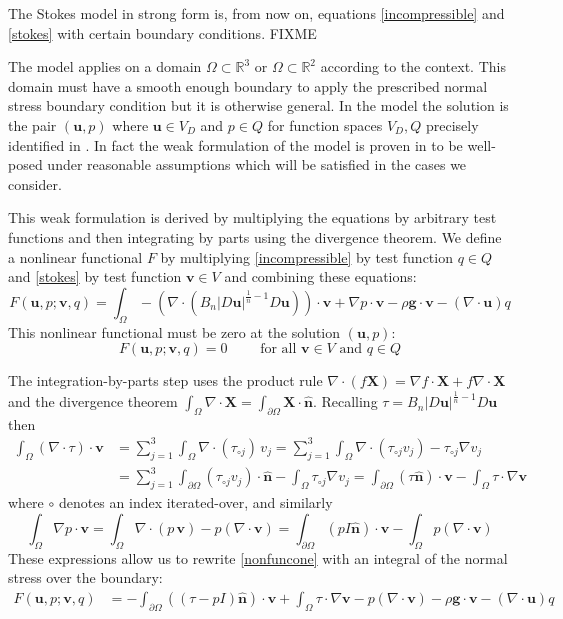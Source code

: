 \documentclass[letterpaper,final,12pt,reqno]{amsart}
\newcommand{\grad}{\nabla}
\newcommand{\RR}{\mathbb{R}}
\newcommand{\hbn}{\hat{\mathbf{n}}}
\newcommand{\bu}{\mathbf{u}}
\newcommand{\bv}{\mathbf{v}}
\newcommand{\bX}{\mathbf{X}}
\begin{document}
The Stokes model in strong form is, from now on, equations \eqref{incompressible} and \eqref{stokes} with certain boundary conditions.  FIXME

The model applies on a domain $\Omega\subset \RR^3$ or $\Omega \subset \RR^2$ according to the context.  This domain must have a smooth enough boundary to apply the prescribed normal stress boundary condition but it is otherwise general.  In the model the solution is the pair $(\bu,p)$ where $\bu\in V_D$ and $p \in Q$ for function spaces $V_D,Q$ precisely identified in \cite{JouvetRappaz2011}.  In fact the weak formulation of the model is proven in \cite{JouvetRappaz2011} to be well-posed under reasonable assumptions which will be satisfied in the cases we consider.

This weak formulation is derived by multiplying the equations by arbitrary test functions and then integrating by parts using the divergence theorem.  We define a nonlinear functional $F$ by multiplying \eqref{incompressible} by test function $q\in Q$ and \eqref{stokes} by test function $\bv\in V$ and combining these equations:
\begin{equation}
F(\bu,p;\bv,q) = \int_\Omega - \left(\nabla \cdot \left(B_n |D\bu|^{\frac{1}{n} - 1} D\bu\right)\right)\cdot \bv + \nabla p \cdot \bv - \rho \mathbf{g} \cdot \bv - \left(\nabla \cdot \bu\right) q \label{nonfuncone}
\end{equation}
This nonlinear functional must be zero at the solution $(\bu,p)$:
\begin{equation}
F(\bu,p;\bv,q) = 0 \qquad \text{ for all } \bv\in V \text{ and } q\in Q
\end{equation}

The integration-by-parts step uses the product rule $\nabla \cdot(f\bX) = \grad f\cdot \bX + f \nabla \cdot \bX$ and the divergence theorem $\int_\Omega \nabla \cdot \bX = \int_{\partial \Omega} \bX \cdot \hbn$.  Recalling $\tau = B_n |D\bu|^{\frac{1}{n} - 1} D\bu$ then
\begin{align*}
\int_\Omega \left(\nabla \cdot \tau\right)\cdot \bv &= \sum_{j=1}^3 \int_\Omega \nabla \cdot (\tau_{\circ j})\, v_j = \sum_{j=1}^3 \int_\Omega \nabla \cdot (\tau_{\circ j} v_j) - \tau_{\circ j} \nabla v_j \\
  &= \sum_{j=1}^3 \int_{\partial \Omega} (\tau_{\circ j} v_j) \cdot \hbn - \int_\Omega \tau_{\circ j} \nabla v_j = \int_{\partial \Omega} (\tau \hbn)\cdot \bv - \int_\Omega \tau \cdot \nabla \bv
\end{align*}
where $\circ$ denotes an index iterated-over, and similarly
    $$\int_\Omega \nabla p \cdot \bv = \int_\Omega \nabla\cdot (p\,\bv) - p (\nabla \cdot \bv) = \int_{\partial \Omega} (p I\hbn)\cdot \bv - \int_\Omega p (\nabla \cdot \bv)$$
These expressions allow us to rewrite \eqref{nonfuncone} with an integral of the normal stress over the boundary:
\begin{align}
F(\bu,p;\bv,q) &= -\int_{\partial\Omega} ((\tau-pI) \hbn)\cdot \bv + \int_\Omega \tau \cdot \nabla \bv - p (\nabla \cdot \bv) - \rho \mathbf{g} \cdot \bv - \left(\nabla \cdot \bu\right) q \label{nonfunctwo}
\end{align}
\end{document}
